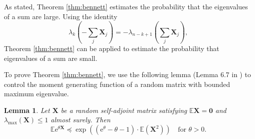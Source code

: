 \documentclass[11pt,letterpaper,twoside,reqno,nosumlimits]{amsart}
\newcommand{\mat}[1]{\ensuremath{\bm{#1}}} %
\newcommand{\e}{\ensuremath{\mathrm{e}}}
\newcommand{\E}{\ensuremath{\mathbb{E}}}
\newcommand{\lambdamax}[1]{\ensuremath{\lambda_{\mathrm{max}}\left(#1\right)}}
\newtheorem{lemma}[thm]{Lemma}
\theoremstyle{remark}
\numberwithin{equation}{section}
\numberwithin{thm}{section}
\numberwithin{prop}{section}
\numberwithin{defn}{section}
\numberwithin{remark}{section}
\begin{document}
As stated, Theorem \ref{thm:bennett} estimates the probability that the eigenvalues of a sum are large. Using the identity
\[
\lambda_k\left(-\sum_j \mat{X}_j\right) = -\lambda_{n-k+1}\left(\sum_j \mat{X}_j\right),
\]
Theorem \ref{thm:bennett} can be applied to estimate the probability that eigenvalues of a sum are small. 

To prove Theorem \ref{thm:bennett}, we use the following lemma (Lemma 6.7  in \cite{T10a}) to control the moment generating function of a random matrix with bounded maximum eigenvalue.
 
\begin{lemma}
Let $\mat{X}$ be a random self-adjoint matrix satisfying $\E\mat{X} = \mat{0}$ and $\lambdamax{\mat{X}} \leq 1$ almost surely. Then
\[ 
\E\e^{\theta\mat{X}} \preceq \exp((\e^{\theta} - \theta - 1) \cdot \E(\mat{X}^2)) \quad \text{for } \theta > 0. 
\]
\label{lemma:freedmanmgf}
\end{lemma}
\end{document}

